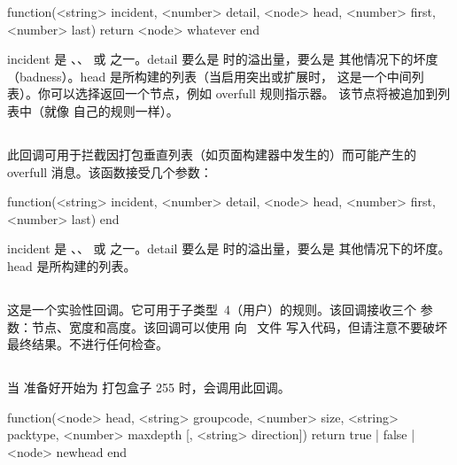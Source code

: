 \begin{typing}
function(<string> incident, <number> detail, <node> head, <number> first,
         <number> last)
    return <node> whatever
end
\end{typing}

incident 是 、、 或
 之一。detail 要么是  时的溢出量，要么是
其他情况下的坏度（badness）。head 是所构建的列表（当启用突出或扩展时，
这是一个中间列表）。你可以选择返回一个节点，例如 overfull 规则指示器。
该节点将被追加到列表中（就像 \TEX 自己的规则一样）。

\subsection{}


此回调可用于拦截因打包垂直列表（如页面构建器中发生的）而可能产生的
overfull 消息。该函数接受几个参数：

\begin{typing}
function(<string> incident, <number> detail, <node> head, <number> first,
         <number> last)
end
\end{typing}

incident 是 、、 或
 之一。detail 要么是  时的溢出量，要么是
其他情况下的坏度。head 是所构建的列表。

\subsection{}


这是一个实验性回调。它可用于子类型~4（用户）的规则。该回调接收三个
参数：节点、宽度和高度。该回调可以使用  向 \PDF\ 文件
写入代码，但请注意不要破坏最终结果。不进行任何检查。

\subsection{}


当 \TEX 准备好开始为  打包盒子 255 时，会调用此回调。

\begin{typing}
function(<node> head, <string> groupcode, <number> size, <string> packtype,
        <number> maxdepth [, <string> direction])
    return true | false | <node> newhead
end
\end{typing}

